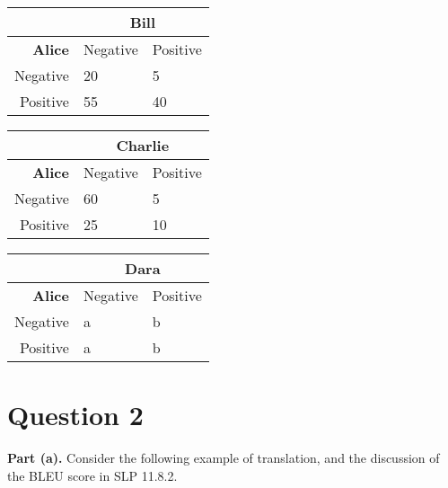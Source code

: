 \documentclass{article}
\newcommand{\solution}[1]{}
\begin{document}
  \begin{small}
  \begin{tabular}{r|ll}
    & \multicolumn{2}{c}{{\bf Bill}} \\ \hline
    {\bf Alice} &  Negative & Positive \\
   Negative                & 20 & 5 \\
   Positive                 & 55 & 40 \\
  \end{tabular}
  
  \begin{tabular}{r|ll}
    & \multicolumn{2}{c}{{\bf Charlie}} \\ \hline
    {\bf Alice} &  Negative & Positive \\
   Negative                & 60 & 5 \\
   Positive                 & 25 & 10 \\
  \end{tabular}
  
  \begin{tabular}{r|ll}
    & \multicolumn{2}{c}{{\bf Dara}} \\ \hline
    {\bf Alice} &  Negative & Positive \\
   Negative                & a & b \\
   Positive                 & a  & b \\
  \end{tabular}
\end{small}

\solution{True: For Alice-Dara that arrangement always gives you kappa = 0, no matter what $a$ and $b$ are! Chance agreement ends up being 0.5, and agreement for the classes involves 
\begin{displaymath}
[(a+b) / (2a+2b) * 2a/(2a+2b)] + [(a+b)/(2a+2b) * (2b/(2a+2b))]
\end{displaymath}
so when you simplify, you end up getting 0.5 as well. Plug it in to the Kappa agreement formula, $\frac{(A0 - Ae)}{(1-Ae)}$ to get $\frac{0}{0.5} = 0$.

For the others (via \url{https://www.easycalculation.com/statistics/cohens-kappa-index.php}): for Alice-Bill kappa = 0.127, and for Alice-Charlie it's 0.241.}


\clearpage
\section*{Question 2}

{\bf Part (a).} Consider the following example of translation, and the discussion of the BLEU score in SLP 11.8.2.
\end{document}
